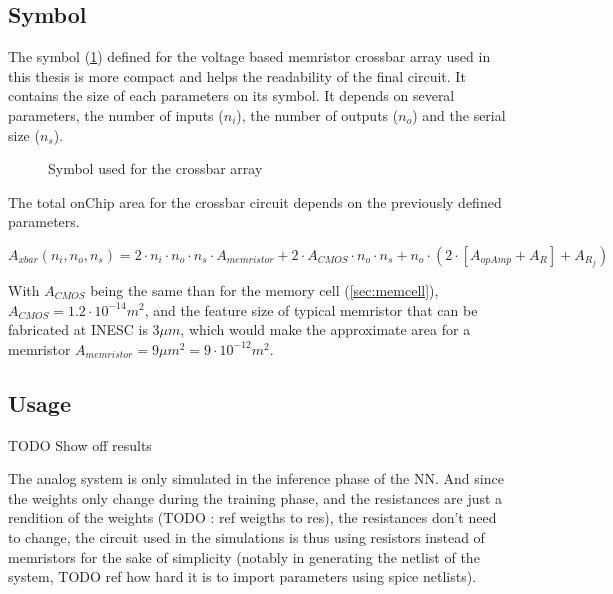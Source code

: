 \subsection{Symbol}
The symbol (\cref{sym:xbar}) defined for the voltage based memristor crossbar array used in this thesis is more compact and helps the readability of the final circuit. It contains the size of each parameters on its symbol. It depends on several parameters, the number of inputs ($n_i$), the number of outputs ($n_o$) and the serial size ($n_s$).

\begin{figure}[H]
  \centering
  
  \caption{Symbol used for the crossbar array}
  \label{sym:xbar}
\end{figure}

The total onChip area for the crossbar circuit depends on the previously defined parameters.

\begin{equation}
  A_{xbar}(n_i,n_o,n_s)=2\cdot n_i\cdot n_o \cdot n_s\cdot A_{memristor}+2\cdot A_{CMOS}\cdot n_o\cdot n_s +n_o\cdot(2\cdot[A_{opAmp}+A_R]+A_{R_f})
\end{equation}

With $A_{CMOS}$ being the same than for the memory cell (\cref{sec:memcell}), $A_{CMOS}=1.2\cdot 10^{-14}m^2$, and the feature size of typical memristor that can be fabricated at INESC is $3\mu m$, which would make the approximate area for a memristor $A_{memristor}=9\mu m^2=9\cdot 10^{-12} m^2$.%

\subsection{Usage}

TODO Show off results

The analog system is only simulated in the inference phase of the \ac{NN}. And since the weights only change during the training phase, and the resistances are just a rendition of the weights (TODO : ref weigths to res), the resistances don't need to change, the circuit used in the simulations is thus using resistors instead of memristors for the sake of simplicity (notably in generating the netlist of the system, TODO ref how hard it is to import parameters using spice netlists).
